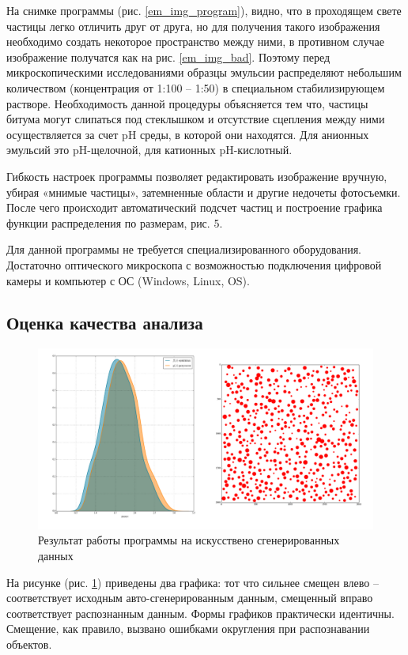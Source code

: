 На снимке программы (рис. \ref{em_img_program}), видно, что в проходящем свете частицы легко отличить друг от друга, но для получения такого изображения необходимо создать некоторое пространство между ними, в противном случае изображение получатся как на рис. \ref{em_img_bad}. Поэтому перед микроскопическими исследованиями образцы эмульсии распределяют небольшим количеством (концентрация от 1:100 – 1:50) в специальном стабилизирующем растворе. Необходимость данной процедуры объясняется тем что, частицы битума могут слипаться под стеклышком и отсутствие сцепления между ними осуществляется за счет pH среды, в которой они находятся. Для анионных эмульсий это pH-щелочной, для катионных pH-кислотный.

Гибкость настроек программы позволяет редактировать изображение вручную, убирая «мнимые частицы», затемненные области и другие недочеты фотосъемки. После чего происходит автоматический подсчет частиц и построение графика функции распределения по размерам, рис. 5. 

Для данной программы не требуется специализированного оборудования. Достаточно оптического микроскопа с возможностью подключения цифровой камеры и компьютер с ОС (Windows, Linux, OS).

\subsection{Оценка качества анализа}

\begin{figure}[ht]
	\centering
	\includegraphics{images/em_07}
	\caption{Результат работы программы на искусствено сгенерированных данных}
	\label{em_artifical}
\end{figure}

На рисунке (рис. \ref{em_artifical}) приведены два графика: тот что сильнее смещен влево – соответствует исходным авто-сгенерированным данным, смещенный вправо соответствует распознанным данным. Формы графиков практически идентичны. Смещение, как правило, вызвано ошибками округления при распознавании объектов.


